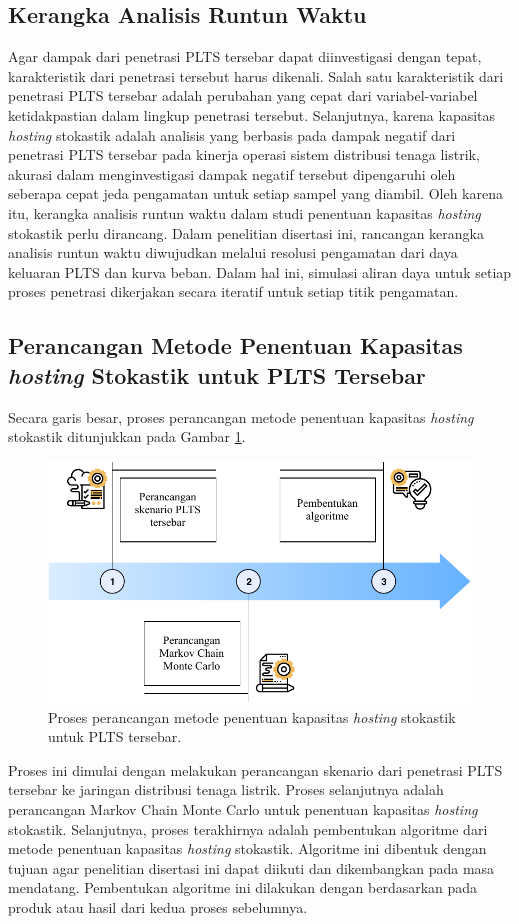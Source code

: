 \subsection{Kerangka Analisis Runtun Waktu}
Agar dampak dari penetrasi PLTS tersebar dapat diinvestigasi dengan tepat, karakteristik dari penetrasi tersebut harus dikenali. Salah satu karakteristik dari penetrasi PLTS tersebar adalah perubahan yang cepat dari variabel-variabel ketidakpastian dalam lingkup penetrasi tersebut. Selanjutnya, karena kapasitas \textit{\textit{hosting}} stokastik adalah analisis yang berbasis pada dampak negatif dari penetrasi PLTS tersebar pada kinerja operasi sistem distribusi tenaga listrik, akurasi dalam menginvestigasi dampak negatif tersebut dipengaruhi oleh seberapa cepat jeda pengamatan untuk setiap sampel yang diambil. Oleh karena itu, kerangka analisis runtun waktu dalam studi penentuan kapasitas \textit{\textit{hosting}} stokastik perlu dirancang. Dalam penelitian disertasi ini, rancangan kerangka analisis runtun waktu diwujudkan melalui resolusi pengamatan dari daya keluaran PLTS dan kurva beban. Dalam hal ini, simulasi aliran daya untuk setiap proses penetrasi dikerjakan secara iteratif untuk setiap titik pengamatan.

\subsection{Perancangan Metode Penentuan Kapasitas \textit{\textit{hosting}} Stokastik untuk PLTS Tersebar}
Secara garis besar, proses perancangan metode penentuan kapasitas \textit{\textit{hosting}} stokastik ditunjukkan pada Gambar \ref{stage2}.
\begin{figure}[!h]
	\centering
	\includegraphics[width=1\textwidth]{Fig/stage2}
	\caption{Proses perancangan metode penentuan kapasitas \textit{\textit{hosting}} stokastik untuk PLTS tersebar.}
	\label{stage2}
\end{figure}
Proses ini dimulai dengan melakukan perancangan skenario dari penetrasi PLTS tersebar ke jaringan distribusi tenaga listrik. Proses selanjutnya adalah perancangan Markov Chain Monte Carlo untuk penentuan kapasitas \textit{\textit{hosting}} stokastik. Selanjutnya, proses terakhirnya adalah pembentukan algoritme dari metode penentuan kapasitas \textit{\textit{hosting}} stokastik. Algoritme ini dibentuk dengan tujuan agar penelitian disertasi ini dapat diikuti dan dikembangkan pada masa mendatang. Pembentukan algoritme ini dilakukan dengan berdasarkan pada produk atau hasil dari kedua proses sebelumnya. 

